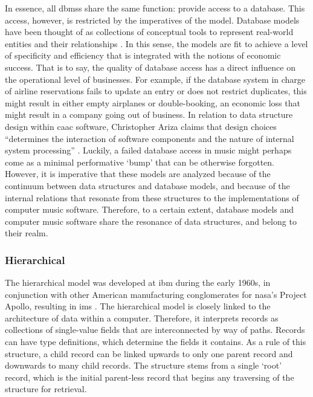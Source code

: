 In essence, all \gls{dbms}s share the same function: provide access to a database. This access, however, is restricted by the imperatives of the model. Database models have been thought of as collections of conceptual tools to represent real-world entities and their relationships \parencite[1]{2008:graph/anglesgutierrez/survey}. In this sense, the models are fit to achieve a level of specificity and efficiency that is integrated with the notions of economic success. That is to say, the quality of database access has a direct influence on the operational level of businesses. For example, if the database system in charge of airline reservations fails to update an entry or does not restrict duplicates, this might result in either empty airplanes or double-booking, an economic loss that might result in a company going out of business. In relation to data structure design within \gls{caac} software, Christopher Ariza \parencite{Ari05:Ano} claims that design choices ``determines the interaction of software components and the nature of internal system processing'' \parencite[18]{Ari05:Ano}. Luckily, a failed database access in music might perhaps come as a minimal performative `bump' that can be otherwise forgotten. However, it is imperative that these models are analyzed because of the continuum between data structures and database models, and because of the internal relations that resonate from these structures to the implementations of computer music software. Therefore, to a certain extent, database models and computer music software share the resonance of data structures, and belong to their realm.

% 
% 




\subsubsection{Hierarchical}
\label{model:hierarchical}


The hierarchical model was developed at \gls{ibm} during the early 1960s, in conjunction with other American manufacturing conglomerates for \gls{nasa}'s Project Apollo, resulting in \gls{ims} \parencite{2000-database-ims}. The hierarchical model is closely linked to the architecture of data within a computer. Therefore, it interprets records as collections of single-value fields that are interconnected by way of paths. Records can have type definitions, which determine the fields it contains. As a rule of this structure, a child record can be linked upwards to only one parent record and downwards to many child records. The structure stems from a single `root' record, which is the initial parent-less record that begins any traversing of the structure for retrieval.

